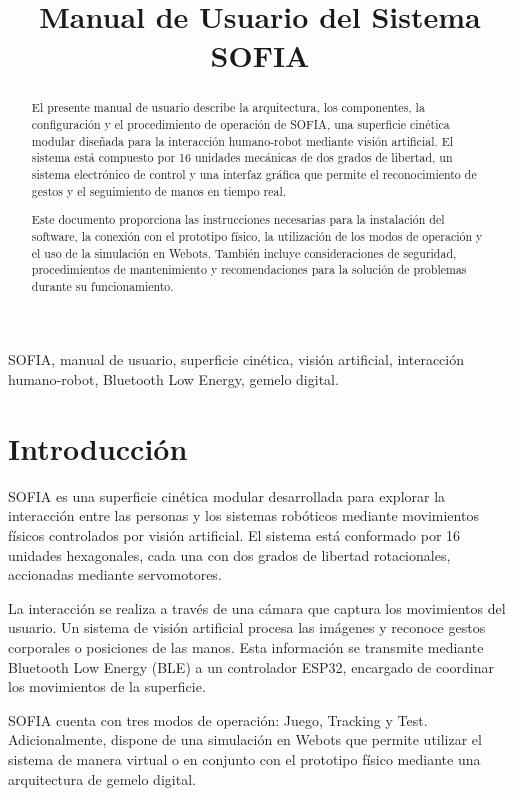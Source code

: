 \documentclass[letterpaper,journal]{IEEEtran}
\begin{document}
\title{Manual de Usuario del Sistema SOFIA}
\maketitle

\begin{abstract}
El presente manual de usuario describe la arquitectura, los
componentes, la configuración y el procedimiento de operación
de SOFIA, una superficie cinética modular diseñada para la
interacción humano-robot mediante visión artificial. El sistema
está compuesto por 16 unidades mecánicas de dos grados de
libertad, un sistema electrónico de control y una interfaz
gráfica que permite el reconocimiento de gestos y el seguimiento
de manos en tiempo real.

Este documento proporciona las instrucciones necesarias para
la instalación del software, la conexión con el prototipo
físico, la utilización de los modos de operación y el uso de
la simulación en Webots. También incluye consideraciones de
seguridad, procedimientos de mantenimiento y recomendaciones
para la solución de problemas durante su funcionamiento.
\end{abstract}

\begin{IEEEkeywords}
SOFIA, manual de usuario, superficie cinética, visión artificial,
interacción humano-robot, Bluetooth Low Energy, gemelo digital.
\end{IEEEkeywords}

\section{Introducción}
\label{sec:introduccion}

SOFIA es una superficie cinética modular desarrollada para
explorar la interacción entre las personas y los sistemas
robóticos mediante movimientos físicos controlados por
visión artificial. El sistema está conformado por 16 unidades
hexagonales, cada una con dos grados de libertad rotacionales,
accionadas mediante servomotores.

La interacción se realiza a través de una cámara que captura
los movimientos del usuario. Un sistema de visión artificial
procesa las imágenes y reconoce gestos corporales o posiciones
de las manos. Esta información se transmite mediante Bluetooth
Low Energy (BLE) a un controlador ESP32, encargado de coordinar
los movimientos de la superficie.

SOFIA cuenta con tres modos de operación: Juego, Tracking y
Test. Adicionalmente, dispone de una simulación en Webots que
permite utilizar el sistema de manera virtual o en conjunto
con el prototipo físico mediante una arquitectura de gemelo
digital.
\end{document}
